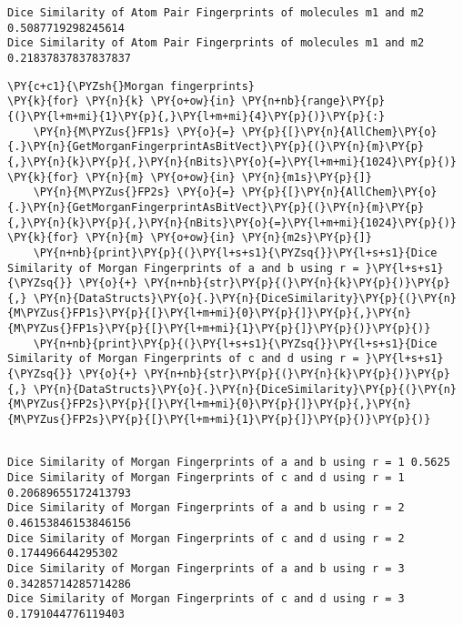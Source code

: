     \begin{Verbatim}[commandchars=\\\{\}]
Dice Similarity of Atom Pair Fingerprints of molecules m1 and m2
0.5087719298245614
Dice Similarity of Atom Pair Fingerprints of molecules m1 and m2
0.21837837837837837
    \end{Verbatim}

    \begin{tcolorbox}[breakable, size=fbox, boxrule=1pt, pad at break*=1mm,colback=cellbackground, colframe=cellborder]
\begin{Verbatim}[commandchars=\\\{\}]
\PY{c+c1}{\PYZsh{}Morgan fingerprints}
\PY{k}{for} \PY{n}{k} \PY{o+ow}{in} \PY{n+nb}{range}\PY{p}{(}\PY{l+m+mi}{1}\PY{p}{,}\PY{l+m+mi}{4}\PY{p}{)}\PY{p}{:}
    \PY{n}{M\PYZus{}FP1s} \PY{o}{=} \PY{p}{[}\PY{n}{AllChem}\PY{o}{.}\PY{n}{GetMorganFingerprintAsBitVect}\PY{p}{(}\PY{n}{m}\PY{p}{,}\PY{n}{k}\PY{p}{,}\PY{n}{nBits}\PY{o}{=}\PY{l+m+mi}{1024}\PY{p}{)} \PY{k}{for} \PY{n}{m} \PY{o+ow}{in} \PY{n}{m1s}\PY{p}{]}
    \PY{n}{M\PYZus{}FP2s} \PY{o}{=} \PY{p}{[}\PY{n}{AllChem}\PY{o}{.}\PY{n}{GetMorganFingerprintAsBitVect}\PY{p}{(}\PY{n}{m}\PY{p}{,}\PY{n}{k}\PY{p}{,}\PY{n}{nBits}\PY{o}{=}\PY{l+m+mi}{1024}\PY{p}{)} \PY{k}{for} \PY{n}{m} \PY{o+ow}{in} \PY{n}{m2s}\PY{p}{]}
    \PY{n+nb}{print}\PY{p}{(}\PY{l+s+s1}{\PYZsq{}}\PY{l+s+s1}{Dice Similarity of Morgan Fingerprints of a and b using r = }\PY{l+s+s1}{\PYZsq{}} \PY{o}{+} \PY{n+nb}{str}\PY{p}{(}\PY{n}{k}\PY{p}{)}\PY{p}{,} \PY{n}{DataStructs}\PY{o}{.}\PY{n}{DiceSimilarity}\PY{p}{(}\PY{n}{M\PYZus{}FP1s}\PY{p}{[}\PY{l+m+mi}{0}\PY{p}{]}\PY{p}{,}\PY{n}{M\PYZus{}FP1s}\PY{p}{[}\PY{l+m+mi}{1}\PY{p}{]}\PY{p}{)}\PY{p}{)}
    \PY{n+nb}{print}\PY{p}{(}\PY{l+s+s1}{\PYZsq{}}\PY{l+s+s1}{Dice Similarity of Morgan Fingerprints of c and d using r = }\PY{l+s+s1}{\PYZsq{}} \PY{o}{+} \PY{n+nb}{str}\PY{p}{(}\PY{n}{k}\PY{p}{)}\PY{p}{,} \PY{n}{DataStructs}\PY{o}{.}\PY{n}{DiceSimilarity}\PY{p}{(}\PY{n}{M\PYZus{}FP2s}\PY{p}{[}\PY{l+m+mi}{0}\PY{p}{]}\PY{p}{,}\PY{n}{M\PYZus{}FP2s}\PY{p}{[}\PY{l+m+mi}{1}\PY{p}{]}\PY{p}{)}\PY{p}{)}
    
\end{Verbatim}
\end{tcolorbox}

    \begin{Verbatim}[commandchars=\\\{\}]
Dice Similarity of Morgan Fingerprints of a and b using r = 1 0.5625
Dice Similarity of Morgan Fingerprints of c and d using r = 1
0.20689655172413793
Dice Similarity of Morgan Fingerprints of a and b using r = 2
0.46153846153846156
Dice Similarity of Morgan Fingerprints of c and d using r = 2 0.174496644295302
Dice Similarity of Morgan Fingerprints of a and b using r = 3
0.34285714285714286
Dice Similarity of Morgan Fingerprints of c and d using r = 3 0.1791044776119403
    \end{Verbatim}

